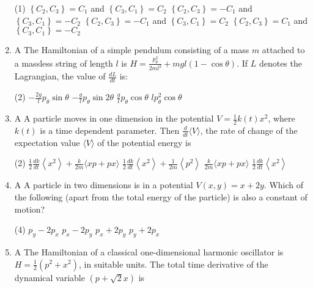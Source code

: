 \begin{enumerate}
 \begin{tasks}(1)
	\task[\textbf{a.}]$\left\{C_{2}, C_{3}\right\}=C_{1}$ and $\left\{C_{3}, C_{1}\right\}=C_{2}$
	\task[\textbf{b.}]$\left\{C_{2}, C_{3}\right\}=-C_{1}$ and $\left\{C_{3}, C_{1}\right\}=-C_{2}$
	\task[\textbf{c.}]$\left\{C_{2}, C_{3}\right\}=-C_{1}$ and $\left\{C_{3}, C_{1}\right\}=C_{2}$
	\task[\textbf{d.}] $\left\{C_{2}, C_{3}\right\}=C_{1}$ and $\left\{C_{3}, C_{1}\right\}=-C_{2}$
\end{tasks}
\item A The Hamiltonian of a simple pendulum consisting of a mass $m$ attached to a massless string of length $l$ is $H=\frac{p_{\theta}^{2}}{2 m l^{2}}+m g l(1-\cos \theta)$. If $L$ denotes the Lagrangian, the value of $\frac{d L}{d t}$ is:
{}
 \begin{tasks}(2)
	\task[\textbf{a.}]$-\frac{2 g}{l} p_{\theta} \sin \theta$
	\task[\textbf{b.}] $-\frac{g}{l} p_{\theta} \sin 2 \theta$
	\task[\textbf{c.}]$\frac{g}{l} p_{\theta} \cos \theta$
	\task[\textbf{d.}] $l p_{\theta}^{2} \cos \theta$
\end{tasks}
\item A A particle moves in one dimension in the potential $V=\frac{1}{2} k(t) x^{2}$, where $k(t)$ is a time dependent parameter. Then $\frac{d}{d t}\langle V\rangle$, the rate of change of the expectation value $\langle V\rangle$ of the potential energy is
{}
 \begin{tasks}(2)
	\task[\textbf{a.}]$\frac{1}{2} \frac{d k}{d t}\left\langle x^{2}\right\rangle+\frac{k}{2 m}\langle x p+p x\rangle$
	\task[\textbf{b.}] $\frac{1}{2} \frac{d k}{d t}\left\langle x^{2}\right\rangle+\frac{1}{2 m}\left\langle p^{2}\right\rangle$
	\task[\textbf{c.}]$\frac{k}{2 m}\langle x p+p x\rangle$
	\task[\textbf{d.}]  $\frac{1}{2} \frac{d k}{d t}\left\langle x^{2}\right\rangle$
\end{tasks}
\item A A particle in two dimensions is in a potential $V(x, y)=x+2 y$. Which of the following (apart from the total energy of the particle) is also a constant of motion?
{}
 \begin{tasks}(4)
	\task[\textbf{a.}] $p_{y}-2 p_{x}$
	\task[\textbf{b.}] $p_{x}-2 p_{y}$
	\task[\textbf{c.}]$p_{x}+2 p_{y}$
	\task[\textbf{d.}]  $p_{y}+2 p_{x}$
\end{tasks}
\item A The Hamiltonian of a classical one-dimensional harmonic oscillator is $H=\frac{1}{2}\left(p^{2}+x^{2}\right)$, in suitable units. The total time derivative of the dynamical variable $(p+\sqrt{2} x)$ is

\end{enumerate}
